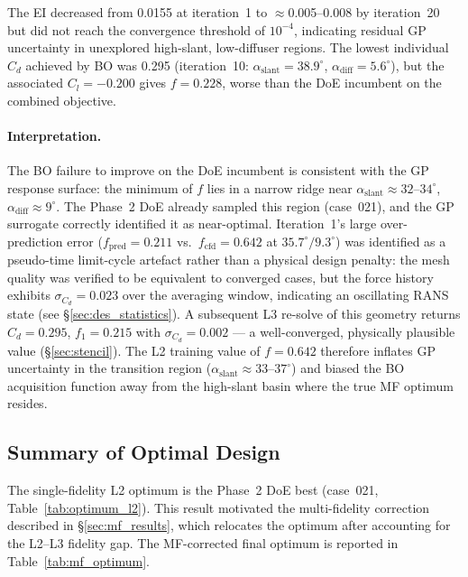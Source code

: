 The EI decreased from 0.0155 at iteration~1 to $\approx$0.005--0.008 by iteration~20 but did not reach the convergence threshold of $10^{-4}$, indicating residual GP uncertainty in unexplored high-slant, low-diffuser regions. The lowest individual $C_d$ achieved by BO was 0.295 (iteration~10: $\alpha_\mathrm{slant}=38.9^\circ$, $\alpha_\mathrm{diff}=5.6^\circ$), but the associated $C_l = -0.200$ gives $f = 0.228$, worse than the DoE incumbent on the combined objective.

\paragraph{Interpretation.} The BO failure to improve on the DoE incumbent is consistent with the GP response surface: the minimum of $f$ lies in a narrow ridge near $\alpha_\mathrm{slant}\approx32$--$34^\circ$, $\alpha_\mathrm{diff}\approx9^\circ$. The Phase~2 DoE already sampled this region (case~021), and the GP surrogate correctly identified it as near-optimal. Iteration~1's large over-prediction error ($f_\mathrm{pred}=0.211$ vs.\ $f_\mathrm{cfd}=0.642$ at $35.7^\circ/9.3^\circ$) was identified as a pseudo-time limit-cycle artefact rather than a physical design penalty: the mesh quality was verified to be equivalent to converged cases, but the force history exhibits $\sigma_{C_d}=0.023$ over the averaging window, indicating an oscillating RANS state (see \S\ref{sec:des_statistics}). A subsequent L3 re-solve of this geometry returns $C_d=0.295$, $f_1=0.215$ with $\sigma_{C_d}=0.002$ — a well-converged, physically plausible value (\S\ref{sec:stencil}). The L2 training value of $f=0.642$ therefore inflates GP uncertainty in the transition region ($\alpha_\mathrm{slant}\approx33$--$37^\circ$) and biased the BO acquisition function away from the high-slant basin where the true MF optimum resides.

\subsection{Summary of Optimal Design}
\label{sec:optimum_summary}

The single-fidelity L2 optimum is the Phase~2 DoE best (case~021, Table~\ref{tab:optimum_l2}). This result motivated the multi-fidelity correction described in \S\ref{sec:mf_results}, which relocates the optimum after accounting for the L2--L3 fidelity gap. The MF-corrected final optimum is reported in Table~\ref{tab:mf_optimum}.

